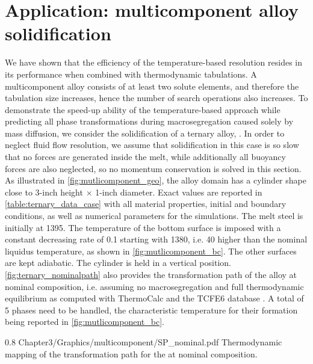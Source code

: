 \section{Application: multicomponent alloy solidification}
%
We have shown that the efficiency of the temperature-based resolution resides in its performance when combined with 
thermodynamic tabulations. A multicomponent alloy consists of at least two solute elements, and 
therefore the tabulation size increases, hence the number of search operations also increases. 
To demonstrate the speed-up ability of the temperature-based approach while predicting all phase 
transformations during macrosegregation caused solely by mass diffusion, we consider the solidification of a ternary alloy, .
In order to neglect fluid flow resolution, we assume that solidification in this case is so slow that no forces are generated inside the melt, while
additionally all buoyancy forces are also neglected, so no momentum conservation is solved in this section.
As illustrated in \cref{fig:mutlicomponent_geo}, the alloy domain has a cylinder shape close to 3-inch height $\times$ 1-inch diameter. 
Exact values are reported in \cref{table:ternary_data_case} with all material properties, initial and boundary conditions, 
as well as numerical parameters for the simulations. The melt steel is initially at \SI{1395}{\udegC}. The 
temperature of the bottom surface is imposed with a constant decreasing rate of \SI{0.1}{\uCR} starting 
with \SI{1380}{\udegC}, i.e. \SI{40}{\udegC} higher than the nominal liquidus temperature, as shown 
in \cref{fig:mutlicomponent_bc}. The other surfaces are kept adiabatic. The cylinder is held in a vertical position. 
\cref{fig:ternary_nominalpath} also provides the transformation path of the alloy at nominal composition, i.e. assuming no macrosegregation and full 
thermodynamic equilibrium as computed with ThermoCalc and the TCFE6 database \citep{tcfe6_tcfe6:_2010, andersson_thermo-calc_2002}. 
A total of 5 phases need to be handled, the characteristic temperature for their formation being reported 
in \cref{fig:mutlicomponent_bc}.
%
\begin{figureth}
{0.8}
{Chapter3/Graphics/multicomponent/SP_nominal.pdf}
{Thermodynamic mapping \citep{tcfe6_tcfe6:_2010, andersson_thermo-calc_2002} of the transformation path for the  at nominal composition.}
\label{fig:ternary_nominalpath}
\end{figureth}
%
